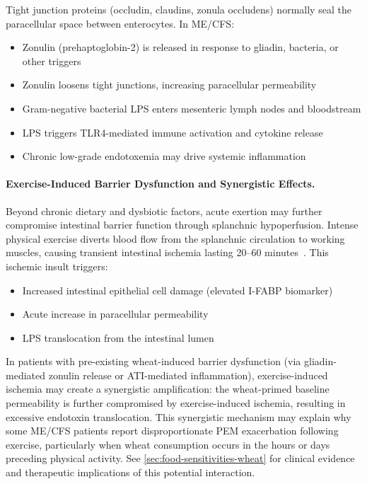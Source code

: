 Tight junction proteins (occludin, claudins, zonula occludens) normally seal the paracellular space between enterocytes. In ME/CFS:
\begin{itemize}
    \item Zonulin (prehaptoglobin-2) is released in response to gliadin, bacteria, or other triggers
    \item Zonulin loosens tight junctions, increasing paracellular permeability
    \item Gram-negative bacterial LPS enters mesenteric lymph nodes and bloodstream
    \item LPS triggers TLR4-mediated immune activation and cytokine release
    \item Chronic low-grade endotoxemia may drive systemic inflammation
\end{itemize}

\paragraph{Exercise-Induced Barrier Dysfunction and Synergistic Effects.}

Beyond chronic dietary and dysbiotic factors, acute exertion may further compromise intestinal barrier function through splanchnic hypoperfusion. Intense physical exercise diverts blood flow from the splanchnic circulation to working muscles, causing transient intestinal ischemia lasting 20--60 minutes~\cite{vanWijck2011}. This ischemic insult triggers:

\begin{itemize}
    \item Increased intestinal epithelial cell damage (elevated I-FABP biomarker)~\cite{March2017}
    \item Acute increase in paracellular permeability~\cite{vanWijck2011}
    \item LPS translocation from the intestinal lumen
\end{itemize}

In patients with pre-existing wheat-induced barrier dysfunction (via gliadin-mediated zonulin release or ATI-mediated inflammation), exercise-induced ischemia may create a synergistic amplification: the wheat-primed baseline permeability is further compromised by exercise-induced ischemia, resulting in excessive endotoxin translocation. This synergistic mechanism may explain why some ME/CFS patients report disproportionate PEM exacerbation following exercise, particularly when wheat consumption occurs in the hours or days preceding physical activity. See \cref{sec:food-sensitivities-wheat} for clinical evidence and therapeutic implications of this potential interaction.

